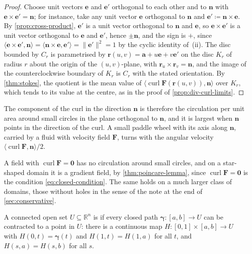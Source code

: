 \begin{proof}
Choose unit vectors $\mathbf e$ and $\mathbf e'$ orthogonal to each other and to $\mathbf n$ with $\mathbf e\times\mathbf e'=\mathbf n$; for instance, take any unit vector $\mathbf e$ orthogonal to $\mathbf n$ and $\mathbf e'\coloneqq\mathbf n\times\mathbf e$. By \cref{prop:cross-product}, $\mathbf e'$ is a unit vector orthogonal to $\mathbf n$ and $\mathbf e$, so $\mathbf e\times\mathbf e'$ is a unit vector orthogonal to $\mathbf e$ and $\mathbf e'$, hence $\pm\mathbf n$, and the sign is $+$, since $\langle\mathbf e\times\mathbf e',\mathbf n\rangle=\langle\mathbf n\times\mathbf e,\mathbf e'\rangle=\|\mathbf e'\|^2=1$ by the cyclic identity of~(ii). The disc bounded by $C_r$ is parametrised by $\mathbf r(u,v)=\mathbf a+u\mathbf e+v\mathbf e'$ on the disc $K_r$ of radius $r$ about the origin of the $(u,v)$-plane, with $\mathbf r_u\times\mathbf r_v=\mathbf n$, and the image of the counterclockwise boundary of $K_r$ is $C_r$ with the stated orientation. By \cref{thm:stokes}, the quotient is the mean value of $\langle\operatorname{curl}\mathbf F(\mathbf r(u,v)),\mathbf n\rangle$ over $K_r$, which tends to its value at the centre, as in the proof of \cref{prop:div-curl-limits}.
\end{proof}

The component of the curl in the direction $\mathbf n$ is therefore the circulation per unit area around small circles in the plane orthogonal to $\mathbf n$, and it is largest when $\mathbf n$ points in the direction of the curl. A small paddle wheel with its axis along $\mathbf n$, carried by a fluid with velocity field $\mathbf F$, turns with the angular velocity $\langle\operatorname{curl}\mathbf F,\mathbf n\rangle/2$.

A field with $\operatorname{curl}\mathbf F=\mathbf0$ has no circulation around small circles, and on a star-shaped domain it is a gradient field, by \cref{thm:poincare-lemma}, since $\operatorname{curl}\mathbf F=\mathbf0$ is the condition \eqref{eq:closed-condition}. The same holds on a much larger class of domains, those without holes in the sense of the note at the end of \cref{sec:conservative}.

\begin{definition}
\label{def:simply-connected}
A connected open set $U\subseteq\mathbb R^n$ is  if every closed path $\boldsymbol\gamma\colon[a,b]\to U$ can be contracted to a point in $U$: there is a continuous map $H\colon[0,1]\times[a,b]\to U$ with $H(0,t)=\boldsymbol\gamma(t)$ and $H(1,t)=H(1,a)$ for all $t$, and $H(s,a)=H(s,b)$ for all $s$.
\end{definition}

